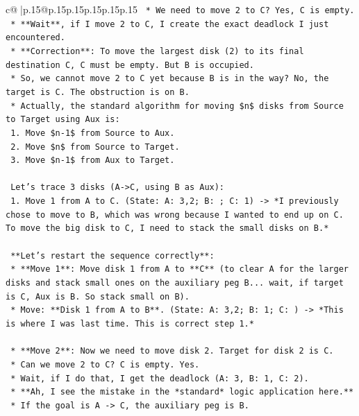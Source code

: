 \documentclass{article}
\begin{document}
{\begin{supertabular}{c@{$\;$}|p{.15\linewidth}@{}p{.15\linewidth}p{.15\linewidth}p{.15\linewidth}p{.15\linewidth}p{.15\linewidth}}
{{{\texttt{    *   We need to move 2 to C? Yes, C is empty.} \\
\texttt{    *   **Wait**, if I move 2 to C, I create the exact deadlock I just encountered.} \\
\texttt{    *   **Correction**: To move the largest disk (2) to its final destination C, C must be empty. But B is occupied.} \\
\texttt{    *   So, we cannot move 2 to C yet because B is in the way? No, the target is C. The obstruction is on B.} \\
\texttt{    *   Actually, the standard algorithm for moving \$n\$ disks from Source to Target using Aux is:} \\
\texttt{        1. Move \$n{-}1\$ from Source to Aux.} \\
\texttt{        2. Move \$n\$ from Source to Target.} \\
\texttt{        3. Move \$n{-}1\$ from Aux to Target.} \\
\\ 
\texttt{    Let's trace 3 disks (A{-}>C, using B as Aux):} \\
\texttt{    1. Move 1 from A to C. (State: A: 3,2; B: ; C: 1) {-}> *I previously chose to move to B, which was wrong because I wanted to end up on C. To move the big disk to C, I need to stack the small disks on B.*} \\
\\ 
\texttt{    **Let's restart the sequence correctly**:} \\
\texttt{    *   **Move 1**: Move disk 1 from A to **C** (to clear A for the larger disks and stack small ones on the auxiliary peg B... wait, if target is C, Aux is B. So stack small on B).} \\
\texttt{        *   Move: **Disk 1 from A to B**. (State: A: 3,2; B: 1; C: ) {-}> *This is where I was last time. This is correct step 1.*} \\
\\ 
\texttt{    *   **Move 2**: Now we need to move disk 2. Target for disk 2 is C.} \\
\texttt{        *   Can we move 2 to C? C is empty. Yes.} \\
\texttt{        *   Wait, if I do that, I get the deadlock (A: 3, B: 1, C: 2).} \\
\texttt{        *   **Ah, I see the mistake in the *standard* logic application here.**} \\
\texttt{        *   If the goal is A {-}> C, the auxiliary peg is B.} \\
}}}
\end{supertabular}}
\end{document}
